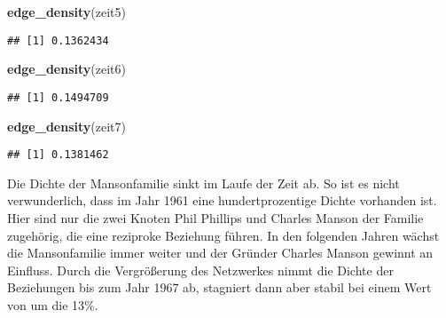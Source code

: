\documentclass[
]{article}
\newenvironment{Shaded}{\begin{snugshade}}{\end{snugshade}}
\newcommand{\KeywordTok}[1]{\textcolor[rgb]{0.13,0.29,0.53}{\textbf{#1}}}
\newcommand{\NormalTok}[1]{#1}
\newcommand{\OperatorTok}[1]{\textcolor[rgb]{0.81,0.36,0.00}{\textbf{#1}}}
\newcommand{\StringTok}[1]{\textcolor[rgb]{0.31,0.60,0.02}{#1}}
\begin{document}
\begin{Shaded}
\begin{Highlighting}[]
\KeywordTok{edge_density}\NormalTok{(zeit5)}
\end{Highlighting}
\end{Shaded}

\begin{verbatim}
## [1] 0.1362434
\end{verbatim}

\begin{Shaded}
\begin{Highlighting}[]
\KeywordTok{edge_density}\NormalTok{(zeit6)}
\end{Highlighting}
\end{Shaded}

\begin{verbatim}
## [1] 0.1494709
\end{verbatim}

\begin{Shaded}
\begin{Highlighting}[]
\KeywordTok{edge_density}\NormalTok{(zeit7)}
\end{Highlighting}
\end{Shaded}

\begin{verbatim}
## [1] 0.1381462
\end{verbatim}

Die Dichte der Mansonfamilie sinkt im Laufe der Zeit ab. So ist es nicht
verwunderlich, dass im Jahr 1961 eine hundertprozentige Dichte vorhanden
ist. Hier sind nur die zwei Knoten Phil Phillips und Charles Manson der
Familie zugehörig, die eine reziproke Beziehung führen. In den folgenden
Jahren wächst die Mansonfamilie immer weiter und der Gründer Charles
Manson gewinnt an Einfluss. Durch die Vergrößerung des Netzwerkes nimmt
die Dichte der Beziehungen bis zum Jahr 1967 ab, stagniert dann aber
stabil bei einem Wert von um die 13\%.

\begin{Shaded}
\end{Shaded}
\end{document}
